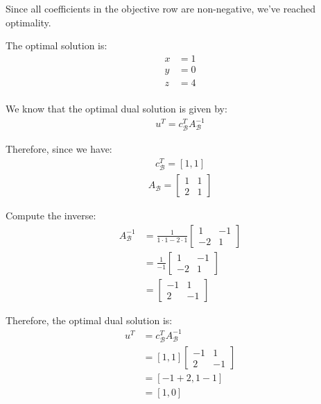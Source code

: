 \documentclass{article}
\begin{document}
Since all coefficients in the objective row are non-negative, we've reached optimality.

The optimal solution is:
\begin{align*}
x &= 1\\
y &= 0\\
z &= 4\\
\end{align*}

We know that the optimal dual solution is given by:
\begin{align*}
    u^T = c_\mathcal{B}^T A_\mathcal{B}^{-1}
\end{align*}

Therefore, since we have:
\begin{align*}
c_\mathcal{B}^T = [1, 1]
\end{align*}
\begin{align*}
A_\mathcal{B} = \begin{bmatrix} 
1 & 1 \\ 
2 & 1 
\end{bmatrix}
\end{align*}

Compute the inverse:
\begin{align*}
A_\mathcal{B}^{-1} &= \frac{1}{1 \cdot 1 - 2 \cdot 1} \begin{bmatrix} 
1 & -1 \\ 
-2 & 1 
\end{bmatrix} \\
&= \frac{1}{-1} \begin{bmatrix} 
1 & -1 \\ 
-2 & 1 
\end{bmatrix} \\
&= \begin{bmatrix} 
-1 & 1 \\ 
2 & -1 
\end{bmatrix}
\end{align*}

Therefore, the optimal dual solution is:
\begin{align*}
u^T &= c_\mathcal{B}^T A_\mathcal{B}^{-1} \\
&= [1, 1] \begin{bmatrix} 
-1 & 1 \\ 
2 & -1 
\end{bmatrix} \\
&= [-1 + 2, 1 - 1] \\
&= [1, 0]
\end{align*}

\newpage
\end{document}
